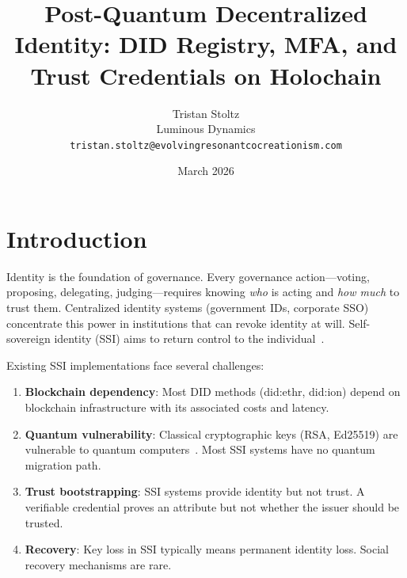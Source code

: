 \documentclass[11pt,twocolumn]{article}
\title{Post-Quantum Decentralized Identity: DID Registry, MFA, and Trust Credentials on Holochain}
\author{Tristan Stoltz \\ Luminous Dynamics \\ \texttt{tristan.stoltz@evolvingresonantcocreationism.com}}
\date{March 2026}
\begin{document}

\section{Introduction}

Identity is the foundation of governance. Every governance action---voting,
proposing, delegating, judging---requires knowing \emph{who} is acting and
\emph{how much} to trust them. Centralized identity systems (government IDs,
corporate SSO) concentrate this power in institutions that can revoke identity
at will. Self-sovereign identity (SSI) aims to return control to the
individual~\cite{tobin2016}.

Existing SSI implementations face several challenges:

\begin{enumerate}[nosep]
  \item \textbf{Blockchain dependency}: Most DID methods (did:ethr, did:ion)
    depend on blockchain infrastructure with its associated costs and latency.
  \item \textbf{Quantum vulnerability}: Classical cryptographic keys (RSA,
    Ed25519) are vulnerable to quantum computers~\cite{shor1994}. Most SSI
    systems have no quantum migration path.
  \item \textbf{Trust bootstrapping}: SSI systems provide identity but not
    trust. A verifiable credential proves an attribute but not whether the
    issuer should be trusted.
  \item \textbf{Recovery}: Key loss in SSI typically means permanent identity
    loss. Social recovery mechanisms are rare.
\end{enumerate}
\end{document}
